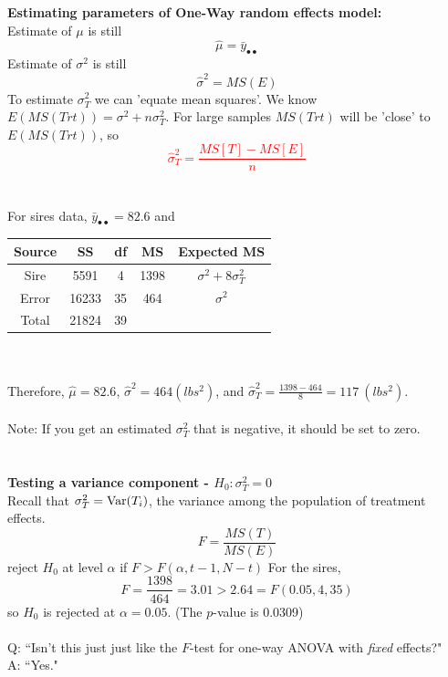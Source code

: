 \textbf{Estimating parameters of One-Way random effects model:}\\
Estimate of $\mu$ is still
$$\hat\mu = \bar{y}_{\bullet\bullet}$$
Estimate of $\sigma^2$ is still
$$\hat\sigma^2 = MS(E) $$
To estimate $\sigma^2_T$ we can 'equate mean squares'.  We know $E(MS(Trt))=\sigma^2+n\sigma^2_T$.  For large samples $MS(Trt)$ will be 'close' to $E(MS(Trt))$, so
\textcolor{red}{$$\hat\sigma_T^2 = \frac{MS[T]-MS[E]}{n}$$}
~\\~\\
For sires data, $\bar{y}_{\bullet\bullet}=82.6$ and 
\begin{center}
\begin{tabular}{ccccc}
Source & SS & df & MS & Expected MS \\ \hline
Sire & 5591 & 4 & 1398 & $\sigma^2 + 8 \sigma_T^2$ \\
Error & 16233 &35 & 464 & $\sigma^2$  \\
Total & 21824 & 39 & &  \\ \hline
\end{tabular}
\end{center}
~\\~\\
Therefore, $\hat\mu = 82.6$, $\hat\sigma^2 = 464 (lbs^2)$, and $\hat\sigma_T^2 = \frac{1398-464}{8} = 117 \ (lbs^2)$.\\~\\
Note: If you get an estimated $\sigma^2_T$ that is negative, it should be set to zero.\\~\\~\\
\textbf{Testing a variance component - $H_0: \sigma_T^2=0$}\\
Recall that $\sigma_T^2 = \mbox{Var}(T_i) $, the variance among the population of treatment effects.
$$ F=\frac{MS(T)}{MS(E)} $$
reject $H_0$ at level $\alpha$ if $F > F(\alpha,t-1,N-t)$
For the sires, 
$$ F=\frac{1398}{464} = 3.01 > 2.64 = F(0.05,4,35) $$ 
so $H_0$ is rejected at $\alpha=0.05$.  (The $p$-value is 0.0309)\\~\\
Q: ``Isn't this just just like the $F$-test for one-way ANOVA with {\em fixed} effects?"\\
A: ``Yes."

\newpage

